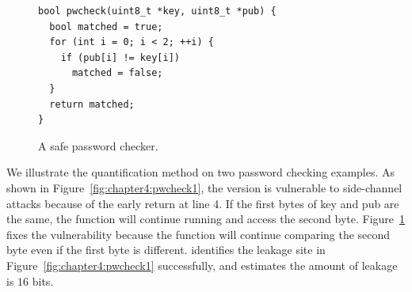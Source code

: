\begin{figure}[h]
    \begin{lstlisting}[xleftmargin=.2\textwidth, xrightmargin=.00\textwidth, frame=none]
bool pwcheck(uint8_t *key, uint8_t *pub) {
  bool matched = true;
  for (int i = 0; i < 2; ++i) {
    if (pub[i] != key[i]) 
      matched = false;
  }
  return matched;
}
\end{lstlisting}\caption{A safe password checker.}\label{fig:chapter4:pwcheck2}
\end{figure}

We illustrate the quantification method on two password checking examples.  As shown in Figure~\ref{fig:chapter4:pwcheck1}, the version is vulnerable to side-channel attacks because of the early return at line 4. If the first bytes of \textsf{key} and \textsf{pub} are the same, the function will continue running and access the second byte. Figure~\ref{fig:chapter4:pwcheck2} fixes the vulnerability because the function will continue comparing the second byte even if the first byte is different.  \tool{} identifies the leakage site in Figure~\ref{fig:chapter4:pwcheck1} successfully, and estimates the amount of leakage is $16$ bits. 



